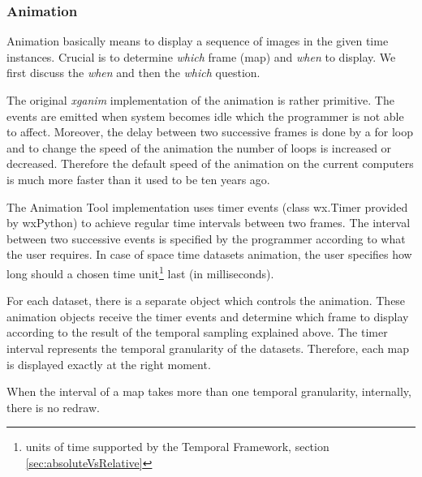 \documentclass[a4paper,12pt]{book}
\newcommand{\module}[1]{\textsl{#1}}
\newcommand{\tf}{Temporal Framework\xspace}
\newcommand{\at}{Animation Tool\xspace}
\begin{document}
\begin{table}
\end{table}

\subsubsection{Animation}
Animation basically means to display a sequence of images in the given time instances.
Crucial is to determine \emph{which} frame (map) and \emph{when} to display.
We first discuss the \emph{when}  and then the \emph{which} question.


The original \module{xganim} implementation of the animation is rather primitive.
The events are emitted when system becomes idle which the programmer is not able to affect.
Moreover, the delay between two successive frames is done by a for loop
and to change the speed of the animation the number of loops is increased or decreased.
Therefore the default speed of the animation on the current computers is much more faster than it used to be ten years ago.

The \at implementation uses timer events (class wx.Timer provided by wxPython) to achieve regular time intervals between two frames.
The interval between two successive events is specified by the programmer according to what the user requires.
In case of space time datasets animation, the user specifies how long
should a chosen time unit\footnote{units of time supported by the \tf, section \ref{sec:absoluteVsRelative}}
last (in milliseconds).

For each dataset, there is a separate object which controls the animation.
These animation objects receive the timer events and determine
which frame to display according to the result of the temporal sampling explained above.
The timer interval represents the temporal granularity of the datasets.
Therefore, each map is displayed exactly at the right moment.

When the interval of a map takes more than one temporal granularity, internally, there is no redraw.
\end{document}
